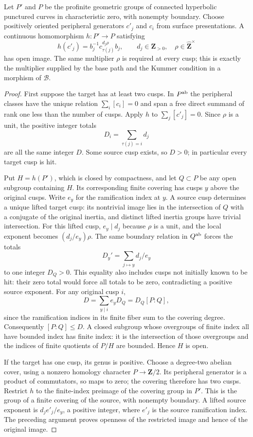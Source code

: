 \begin{proposition}
\label{A:positive-degree-open}
Let $P'$ and $P$ be the profinite geometric groups of
connected hyperbolic punctured curves in characteristic
zero, with nonempty boundary.  Choose positively oriented
peripheral generators $c'_j$ and $c_i$ from surface
presentations.  A continuous homomorphism $h:P'\to P$
satisfying
\[
 h(c'_j)=b_j^{-1}c_{\tau(j)}^{d_j\rho}b_j,
 \qquad d_j\in\mathbf Z_{>0},\quad
 \rho\in\widehat{\mathbf Z}^{\times}
\]
has open image.  The same multiplier $\rho$ is required
at every cusp; this is exactly the multiplier supplied
by the base path and the Kummer condition in a
morphism of $\mathcal B$.
\end{proposition}
\begin{proof}
First suppose the target has at least two cusps.
In $P^{\rm ab}$ the peripheral classes have the unique
relation $\sum_i[c_i]=0$ and span a free direct summand
of rank one less than the number of cusps.  Apply $h$
to $\sum_j[c'_j]=0$.  Since $\rho$ is a unit, the
positive integer totals
\[
                   D_i=\sum_{\tau(j)=i}d_j
\]
are all the same integer $D$.  Some source cusp exists,
so $D>0$; in particular every target cusp is hit.

Put $H=h(P')$, which is closed by compactness, and
let $Q\subset P$ be any open subgroup containing $H$.
Its corresponding finite covering has cusps $y$ above
the original cusps.  Write $e_y$ for the ramification
index at $y$.  A source cusp determines a unique lifted
target cusp: its nontrivial image lies in the
intersection of $Q$ with a conjugate of the original
inertia, and distinct lifted inertia groups have
trivial intersection.  For this lifted cusp,
$e_y\mid d_j$ because $\rho$ is a unit, and the local
exponent becomes $(d_j/e_y)\rho$.  The same boundary
relation in $Q^{\rm ab}$ forces the totals
\[
             D_y'=\sum_{j\mapsto y}d_j/e_y
\]
to one integer $D_Q>0$.  This equality also includes
cusps not initially known to be hit: their zero total
would force all totals to be zero, contradicting a
positive source exponent.  For any original cusp $i$,
\[
 D=\sum_{y\mid i} e_yD_Q
   =D_Q[P:Q],
\]
since the ramification indices in its finite fiber sum
to the covering degree.  Consequently $[P:Q]\le D$.
A closed subgroup whose overgroups of finite index all
have bounded index has finite index: it is the
intersection of those overgroups and the indices of
finite quotients of $P/H$ are bounded.  Hence $H$ is
open.

If the target has one cusp, its genus is positive.
Choose a degree-two abelian cover, using a nonzero
homology character $P\to\mathbf Z/2$.  Its peripheral
generator is a product of commutators, so maps to zero;
the covering therefore has two cusps.  Restrict $h$ to
the finite-index preimage of the covering group in
$P'$.  This is the group of a finite covering of the
source, with nonempty boundary.  A lifted source
exponent is $d_j e'_j/e_y$, a positive integer, where
$e'_j$ is the source ramification index.  The preceding
argument proves openness of the restricted image and
hence of the original image.
\end{proof}

